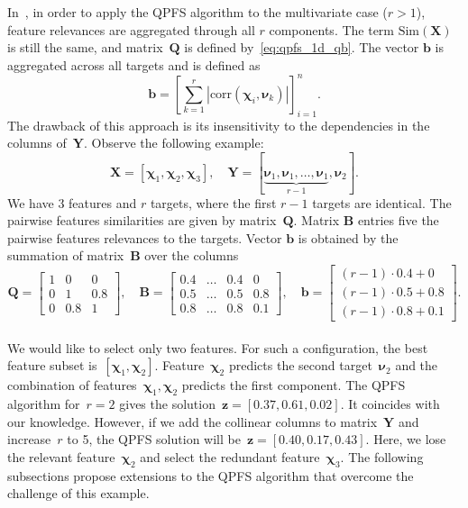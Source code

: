 \documentclass[preprint,12pt]{elsarticle}
\theoremstyle{definition}
\newcommand{\bz}{\mathbf{z}}
\newcommand{\bb}{\mathbf{b}}
\newcommand{\bY}{\mathbf{Y}}
\newcommand{\bX}{\mathbf{X}}
\newcommand{\bB}{\mathbf{B}}
\newcommand{\bQ}{\mathbf{Q}}
\newcommand{\bchi}{\boldsymbol{\chi}}
\newcommand{\bnu}{\boldsymbol{\nu}}
\begin{document}
In~\cite{motrenko2018multi}, in order to apply the QPFS algorithm to the multivariate case ($r > 1$), feature relevances are aggregated through all $r$ components. The term $\text{Sim}(\bX)$ is still the same, and matrix~$\bQ$ is defined by~\eqref{eq:qpfs_1d_qb}. The vector $\bb$ is aggregated across all targets and is defined as
\begin{equation*}
\bb = \left[\sum_{k=1}^r|\text{corr}(\bchi_i, \bnu_k)|\right]_{i=1}^n.
\end{equation*}
The drawback of this approach is its insensitivity to the dependencies in the columns of~$\bY$. Observe the following example:
\begin{equation*}
\bX = [\bchi_1, \bchi_2, \bchi_3], \quad \bY = [\underbrace{\bnu_1, \bnu_1, \dots, \bnu_1}_{r-1}, \bnu_2].
\end{equation*}
We have 3 features and $r$ targets, where the first $r-1$ targets are identical.
The pairwise features similarities are given by matrix~$\bQ$.
Matrix $\bB$ entries five the pairwise features relevances to the targets.
Vector $\bb$ is obtained by the summation of matrix~$\bB$ over the columns
\begin{equation}
\bQ = \begin{bmatrix} 1 & 0 & 0\\ 0 & 1 & 0.8 \\ 0 & 0.8 & 1 \end{bmatrix}, \quad
\bB = \begin{bmatrix} 0.4 & \dots & 0.4 & 0 \\ 0.5 & \dots & 0.5 & 0.8 \\ 0.8 & \dots & 0.8 & 0.1 \end{bmatrix}, \quad
\bb = \begin{bmatrix} (r-1) \cdot 0.4 + 0 \\ (r-1) \cdot 0.5 + 0.8 \\ (r-1) \cdot 0.8 + 0.1 \end{bmatrix}.
\label{eq:qpfs_example}
\end{equation}
\vspace{0.5cm} \\
We would like to select only two features.
For such a configuration, the best feature subset is~$[\bchi_1, \bchi_2]$.
Feature~$\bchi_2$ predicts the second target~$\bnu_2$ and the combination of features~$\bchi_1, \bchi_2$ predicts the first component.
The QPFS algorithm for~$r=2$ gives the solution~$\bz = [0.37,	0.61,	0.02]$. It coincides with our knowledge.
However, if we add the collinear columns to matrix~$\bY$ and increase~$r$ to 5, the QPFS solution will be~$\bz = [0.40,	0.17, 0.43]$.
Here, we lose the relevant feature~$\bchi_2$ and select the redundant feature~$\bchi_3$.
The following subsections propose extensions to the QPFS algorithm that overcome the challenge of this example.
\end{document}
